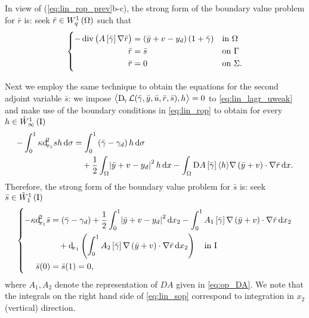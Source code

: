 \documentclass[final]{siamltex}
\begin{document}
		In view of (\ref{eq:lin_rop_prev}b-c), the strong form of the boundary value problem for ${\bar{r}}$ is: 		
		seek ${\bar{r}} \in {{W^{{1}}_{{q}}\del{{\Omega}}}}$	such that
		 \begin{equation}\label{eq:lin_rop}
		 \left\{
			\begin{aligned}
				-\operatorname{div}{\del{{A\sbr{\bar\gamma}{\nabla}{\bar{r}}}}} &=  \del{{\bar{y}} + v - y_d}\del{1+{\bar{\gamma}}}  && {{\textnormal{{in }}}} \Omega \\
					{\bar{r}} &= {\bar{s}} && {{\textnormal{{on }}}} \Gamma \\ 
					{\bar{r}} &= 0 && {{\textnormal{{on }}}} \Sigma.
			\end{aligned}\right.
		\end{equation}
		
Next we employ the same technique to obtain the equations for the second adjoint variable ${\bar{s}}$: we impose ${\left\langle {\Dif_{\gamma}{\mathcal{L}}{\del{{\bar{\gamma}},{\bar{y}},{\bar{u}},{\bar{r}},{\bar{s}}}},h} \right\rangle}  = 0$  to \eqref{eq:lin_lagr_uweak} and make use of
the boundary conditions in \eqref{eq:lin_rop} to obtain for every $h \in {{\mathring{W}^{1}_{\infty}\del{{\text{\rm I}}}}}$
		\begin{align*}
			-\int_0^1\kappa {\operatorname{d}\!}^2_{x_1}s h\dif\sigma 
				&=  \int_0^1 \del{{\bar{\gamma}} - \gamma_d}h \dif\sigma \\
				&\quad+  \frac{1}{2} \int_\Omega \abs{{\bar{y}} + v - y_d}^2 h \dif x 
				-\int_\Omega \Dif A\sbr{\bar{\gamma}}{\langle {h} \rangle}{\nabla}\del{{\bar{y}} + v}\cdot {\nabla}{\bar{r}} \dif x.
		\end{align*} 
Therefore, the strong form of the boundary value problem for ${\bar{s}}$ is: 
seek ${\bar{s}} \in {{\mathring{W}^{{1}}_{{1}}\del{{\text{\rm I}}}}}$ 
		\begin{equation}\label{eq:lin_sop}
		\left\{ 
			\begin{aligned}
				-\kappa {\operatorname{d}\!}^2_{x_1}{\bar{s}} 
				    &= \del{{\bar{\gamma}} - \gamma_d} 
				     +  \frac{1}{2}\int_0^1 \abs{{\bar{y}}+v-y_d}^2 \dif x_2 
			            - \int_0^1 A_1\sbr{\bar{\gamma}}{\nabla}\del{{\bar{y}} + v} \cdot {\nabla} {\bar{r}}\dif x_2 \\
				    &\quad
+ {\operatorname{d}\!}_{x_1}\del{\int_0^1 A_2\sbr{\bar{\gamma}}{\nabla}\del{{\bar{y}}+v} \cdot {\nabla} {\bar{r}}\dif x_2}
						\quad {{\textnormal{{in }}}} {\text{\rm I}} \\
				{\bar{s}}(0) &= {\bar{s}}(1) = 0,
			\end{aligned}\right.
		\end{equation}
where $A_1, A_2$ denote the representation of $DA$ given in \eqref{eq:op_DA}. We note that the integrals on the right 
hand side of \eqref{eq:lin_sop} correspond to integration in $x_2$ (vertical) direction. 
	
\end{document}

